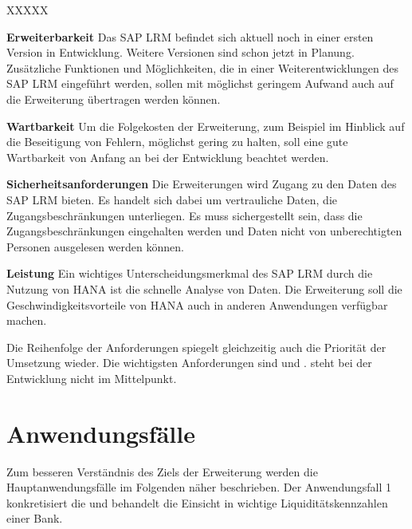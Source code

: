 \begin{onehalfspacing}
\begin{seToplist}{ XXXXX }
\item[\anfl{erweiterbarkeit}] \textbf{Erweiterbarkeit} \newline
Das SAP LRM befindet sich aktuell noch in einer ersten Version in Entwicklung. Weitere Versionen sind schon jetzt in Planung. Zusätzliche Funktionen und Möglichkeiten, die in einer Weiterentwicklungen des SAP LRM eingeführt werden, sollen mit möglichst geringem Aufwand auch auf die Erweiterung übertragen werden können.

\item[\anfl{wartbarkeit}] \textbf{Wartbarkeit} \newline
Um die Folgekosten der Erweiterung, zum Beispiel im Hinblick auf die Beseitigung von Fehlern, möglichst gering zu halten, soll eine gute Wartbarkeit von Anfang an bei der Entwicklung beachtet werden.

\item[\anfl{sicherheit}] \textbf{Sicherheitsanforderungen} \newline
Die Erweiterungen wird Zugang zu den Daten des SAP LRM bieten. Es handelt sich dabei um vertrauliche Daten, die  Zugangsbeschränkungen unterliegen. Es muss sichergestellt sein, dass die Zugangsbeschränkungen eingehalten werden und Daten nicht von unberechtigten Personen ausgelesen werden können.

\item[\anfl{leistung}] \textbf{Leistung} \newline
Ein wichtiges Unterscheidungsmerkmal des SAP LRM durch die Nutzung von \gls{HANA} ist die schnelle Analyse von Daten. Die Erweiterung soll die Geschwindigkeitsvorteile von \gls{HANA} auch in anderen Anwendungen verfügbar machen.

\end{seToplist}

Die Reihenfolge der Anforderungen spiegelt gleichzeitig auch die Priorität der Umsetzung wieder. Die wichtigsten Anforderungen sind   und .  steht bei der Entwicklung nicht im Mittelpunkt.

\section{Anwendungsfälle}
Zum besseren Verständnis des Ziels der Erweiterung werden die Hauptanwendungsfälle im Folgenden näher beschrieben. Der Anwendungsfall 1 konkretisiert die  und behandelt die Einsicht in wichtige Liquiditätskennzahlen einer Bank.


\end{onehalfspacing}
